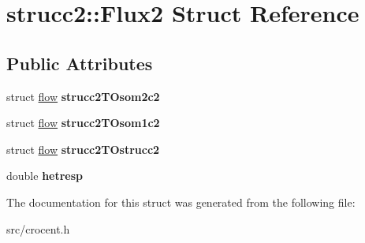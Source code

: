 \hypertarget{structstrucc2_1_1_flux2}{\section{strucc2\-:\-:Flux2 Struct Reference}
\label{structstrucc2_1_1_flux2}
}
\subsection*{Public Attributes}
\begin{DoxyCompactItemize}
\item 
\hypertarget{structstrucc2_1_1_flux2_ac716dadffd93b25acabf16bbc41123b5}{struct \hyperlink{structflow}{flow} {\bfseries strucc2\-T\-Osom2c2}}\label{structstrucc2_1_1_flux2_ac716dadffd93b25acabf16bbc41123b5}

\item 
\hypertarget{structstrucc2_1_1_flux2_a5fe3089d115da38c7ea23076593dffd1}{struct \hyperlink{structflow}{flow} {\bfseries strucc2\-T\-Osom1c2}}\label{structstrucc2_1_1_flux2_a5fe3089d115da38c7ea23076593dffd1}

\item 
\hypertarget{structstrucc2_1_1_flux2_a06d1bf4c7f39a9cffeb61dc41ba709d6}{struct \hyperlink{structflow}{flow} {\bfseries strucc2\-T\-Ostrucc2}}\label{structstrucc2_1_1_flux2_a06d1bf4c7f39a9cffeb61dc41ba709d6}

\item 
\hypertarget{structstrucc2_1_1_flux2_a22b9bafffececdb9fb512e1a3444549e}{double {\bfseries hetresp}}\label{structstrucc2_1_1_flux2_a22b9bafffececdb9fb512e1a3444549e}

\end{DoxyCompactItemize}


The documentation for this struct was generated from the following file\-:\begin{DoxyCompactItemize}
\item 
src/crocent.\-h\end{DoxyCompactItemize}
